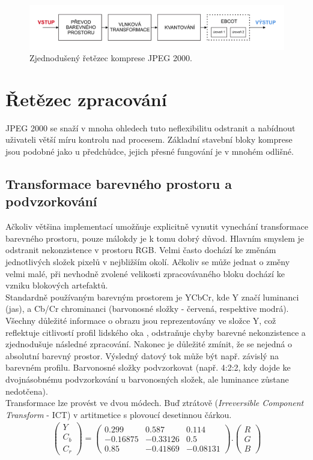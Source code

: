\begin{figure}[hbt!]
  \hspace*{-0.5cm}
  \includegraphics[width=16cm]{obrazky-figures/Artboard2.pdf}
  \caption{Zjednodušený řetězec komprese JPEG 2000.}
  \label{retezec}
\end{figure}

\section{Řetězec zpracování}
JPEG 2000 se snaží v mnoha ohledech tuto neflexibilitu odstranit a nabídnout uživateli větší míru kontrolu nad procesem. Základní stavební bloky komprese jsou podobné jako u předchůdce, jejich přesné fungování je v mnohém odlišné.
\subsection*{Transformace barevného prostoru a podvzorkování}
Ačkoliv většina implementací umožňuje explicitně vynutit vynechání transformace barevného prostoru, pouze málokdy je k tomu dobrý důvod. Hlavním smyslem je odstranit nekonzistence v prostoru RGB. Velmi často dochází ke změnám jednotlivých složek pixelů v nejbližším okolí. Ačkoliv se může jednat o změny velmi malé, při nevhodně zvolené velikosti zpracovávaného bloku dochází ke vzniku blokových artefaktů.\\
Standardně používaným barevným prostorem je YCbCr, kde Y značí luminanci (jas), a Cb/Cr chrominanci (barvonosné složky - červená, respektive modrá). Všechny důležité informace o obrazu jsou reprezentovány ve složce Y, což reflektuje citlivostí profil lidského oka \cite{oko}, odstraňuje chyby barevné nekonzistence a zjednodušuje následné zpracování. Nakonec je důležité zmínit, že se nejedná o absolutní barevný prostor. Výsledný datový tok může být např. závislý na barevném profilu. Barvonosné složky podvzorkovat (např. 4:2:2, kdy dojde ke dvojnásobnému podvzorkování u barvonosných složek, ale luminance zůstane nedotčena).\\
Transformace lze provést ve dvou módech. Buď ztrátově (\textit{Irreversible Component Transform} - ICT) v artitmetice s plovoucí desetinnou čárkou.
\begin{gather}
 \begin{pmatrix} Y \\ C_b \\ C_r \end{pmatrix}
 =
 \begin{pmatrix} 0.299 & 0.587 & 0.114 \\ -0.16875 & - 0.33126 & 0.5 \\ 0.85 & - 0.41869 & -0.08131 \end{pmatrix}
.
 \begin{pmatrix} R \\ G \\ B \end{pmatrix}
\end{gather}

